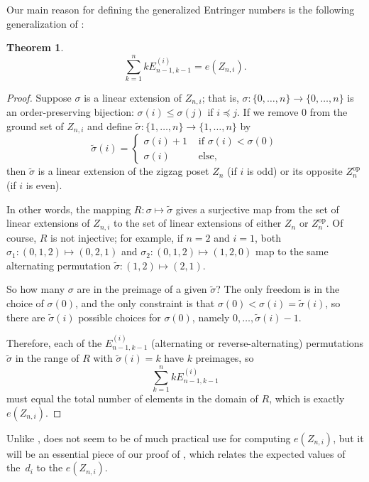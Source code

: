 \documentclass{article}
\newtheorem{theorem}{Theorem}
\theoremstyle{definition}
\newcommand{\gent}[3]{E_{#1,#2}^{(#3)}}
\begin{document}
Our main reason for defining the generalized Entringer numbers is the following generalization of :

\begin{theorem}\label{thm:generalized entringer sum}
	\[
		\sum_{k=1}^n k \gent{n-1}{k-1}{i} = e(Z_{n,i}).
	\]
\end{theorem}

\begin{proof}
	Suppose $\sigma$ is a linear extension of $Z_{n,i}$; that is, $\sigma: \{0,\dots , n\} \to \{0, \dots , n\}$ is an order-preserving bijection: $\sigma(i) \leq \sigma(j)$ if $i \preceq j$. If we remove 0 from the ground set of $Z_{n,i}$ and define $\widetilde{\sigma}:\{1, \dots , n\} \to \{1, \dots , n\}$ by
	\[
		\widetilde{\sigma}(i) = \begin{cases} \sigma(i)+1 & \text{ if } \sigma(i) < \sigma(0) \\ \sigma(i) & \text{ else,} \end{cases}
	\]
	then $\widetilde{\sigma}$ is a linear extension of the zigzag poset $Z_n$ (if $i$ is odd) or its opposite $Z_n^{\text{op}}$ (if $i$ is even).

	In other words, the mapping $R: \sigma \mapsto \widetilde{\sigma}$ gives a surjective map from the set of linear extensions of $Z_{n,i}$ to the set of linear extensions of either $Z_n$ or $Z_n^{\text{op}}$. Of course, $R$ is not injective; for example, if $n=2$ and $i=1$, both $\sigma_1: (0,1,2) \mapsto (0,2,1)$ and $\sigma_2: (0,1,2) \mapsto (1,2,0)$ map to the same alternating permutation $\widetilde{\sigma}: (1,2) \mapsto (2,1)$.

	So how many $\sigma$ are in the preimage of a given $\widetilde{\sigma}$? The only freedom is in the choice of $\sigma(0)$, and the only constraint is that $\sigma(0) < \sigma(i) = \widetilde{\sigma}(i)$, so there are $\widetilde{\sigma}(i)$ possible choices for $\sigma(0)$, namely $0, \dots , \widetilde{\sigma}(i) - 1$.

	Therefore, each of the $\gent{n-1}{k-1}{i}$ (alternating or reverse-alternating) permutations $\widetilde{\sigma}$ in the range of $R$ with $\widetilde{\sigma}(i) = k$ have $k$ preimages, so
	\[
		\sum_{k=1}^n k \gent{n-1}{k-1}{i}
	\]
	must equal the total number of elements in the domain of $R$, which is exactly $e(Z_{n,i})$.
\end{proof}

Unlike ,  does not seem to be of much practical use for computing $e(Z_{n,i})$, but it will be an essential piece of our proof of , which relates the expected values of the~$d_i$ to the $e(Z_{n,i})$.
\end{document}
